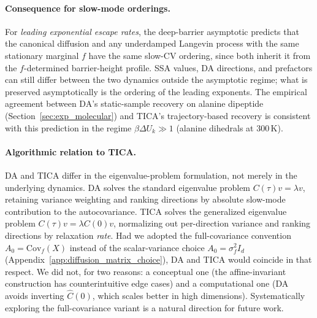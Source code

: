 \documentclass{article}
\newcommand{\Cov}{\mathrm{Cov}}
\begin{document}
\paragraph{Consequence for slow-mode orderings.}
For \emph{leading exponential escape rates}, the deep-barrier asymptotic predicts that the canonical diffusion and any underdamped Langevin process with the same stationary marginal $f$ have the same slow-CV ordering, since both inherit it from the $f$-determined barrier-height profile. SSA values, DA directions, and prefactors can still differ between the two dynamics outside the asymptotic regime; what is preserved asymptotically is the ordering of the leading exponents. The empirical agreement between DA's static-sample recovery on alanine dipeptide (Section~\ref{sec:exp_molecular}) and TICA's trajectory-based recovery is consistent with this prediction in the regime $\beta \Delta U_k \gg 1$ (alanine dihedrals at 300\,K).
\paragraph{Algorithmic relation to TICA.}
DA and TICA differ in the eigenvalue-problem formulation, not merely in the underlying dynamics. DA solves the standard eigenvalue problem $C(\tau)v = \lambda v$, retaining variance weighting and ranking directions by absolute slow-mode contribution to the autocovariance. TICA solves the generalized eigenvalue problem $C(\tau)v = \lambda C(0)v$, normalizing out per-direction variance and ranking directions by relaxation \emph{rate}. Had we adopted the full-covariance convention $A_0 = \Cov_f(X)$ instead of the scalar-variance choice $A_0 = \sigma_f^2 I_d$ (Appendix~\ref{app:diffusion_matrix_choice}), DA and TICA would coincide in that respect. We did not, for two reasons: a conceptual one (the affine-invariant construction has counterintuitive edge cases) and a computational one (DA avoids inverting $\hat C(0)$, which scales better in high dimensions). Systematically exploring the full-covariance variant is a natural direction for future work.
\end{document}

